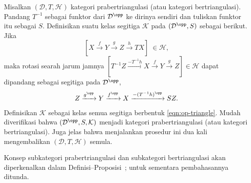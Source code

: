 \begin{catatan}[Dualitas]\label{rem:triangulated-op}
	Misalkan $(\mathcal{D},T,\mathcal{H})$ kategori prabertriangulasi (atau
	kategori bertriangulasi). Pandang $T^{-1}$ sebagai funktor dari
	$\mathcal{D}^{\opp}$ ke dirinya sendiri dan tuliskan funktor itu sebagai
	$S$. Definisikan suatu kelas segitiga $\mathcal{K}$ pada
	$(\mathcal{D}^{\opp},S)$ sebagai berikut. Jika
	\[ [X\xrightarrow{f}Y\xrightarrow{g}Z\xrightarrow{h}TX]
		\;\in\mathcal{H}, \]
	maka rotasi searah jarum jamnya
	$[T^{-1}Z\xrightarrow{-T^{-1}h}X\xrightarrow{f}Y\xrightarrow{g}Z]
	\in\mathcal{H}$ dapat dipandang sebagai segitiga pada
	$\mathcal{D}^{\opp}$,
	\begin{equation}\label{eqn:op-triangle}
		Z\xrightarrow{g^{\opp}}Y\xrightarrow{f^{\opp}}X
		\xrightarrow{-(T^{-1}h)^{\opp}}SZ.
	\end{equation}
	Definisikan $\mathcal{K}$ sebagai kelas semua segitiga berbentuk
	\eqref{eqn:op-triangle}. Mudah diverifikasi bahwa
	$(\mathcal{D}^{\opp},S,\mathcal{K})$ menjadi kategori
	prabertriangulasi (atau kategori bertriangulasi). Juga jelas bahwa
	menjalankan prosedur ini dua kali mengembalikan
	$(\mathcal{D},T,\mathcal{H})$ semula.
\end{catatan}

Konsep subkategori prabertriangulasi dan subkategori bertriangulasi akan
diperkenalkan dalam
Definisi--Proposisi~;
untuk sementara pembahasannya ditunda.
